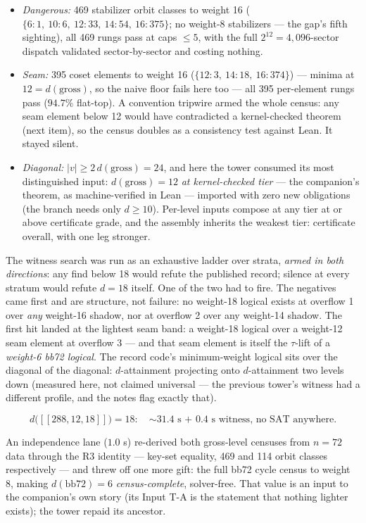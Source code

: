 \documentclass[11pt]{article}
\theoremstyle{plain}
\theoremstyle{definition}
\theoremstyle{remark}
\newcommand{\wt}[1]{\lvert #1\rvert}
\begin{document}
\begin{itemize}[leftmargin=2em]
\item \emph{Dangerous:} 469 stabilizer orbit classes to weight 16
  ($\{6{:}1,\ 10{:}6,\ 12{:}33,\ 14{:}54,\ 16{:}375\}$; no weight-8
  stabilizers --- the gap's fifth sighting), all 469 rungs pass at caps
  $\leq 5$, with the full $2^{12} = 4{,}096$-sector dispatch validated
  sector-by-sector and costing nothing.
\item \emph{Seam:} 395 coset elements to weight 16 ($\{12{:}3,\
  14{:}18,\ 16{:}374\}$) --- minima at $12 = d(\mathrm{gross})$, so the
  naive floor fails here too --- all 395 per-element rungs pass ($94.7\%$
  flat-top). A convention tripwire armed the whole census: any seam
  element below 12 would have contradicted a kernel-checked theorem
  (next item), so the census doubles as a consistency test against Lean.
  It stayed silent.
\item \emph{Diagonal:} $\wt v \geq 2\, d(\mathrm{gross}) = 24$, and
  here the tower consumed its most distinguished input: $d(\mathrm{gross})
  = 12$ \emph{at kernel-checked tier} --- the companion's theorem, as
  machine-verified in Lean --- imported with zero new obligations (the
  branch needs only $d \geq 10$). Per-level inputs compose at any tier
  at or above certificate grade, and the assembly inherits the weakest
  tier: certificate overall, with one leg stronger.
\end{itemize}

The witness search was run as an exhaustive ladder over strata,
\emph{armed in both directions}: any find below 18 would refute the
published record; silence at every stratum would refute $d = 18$ itself.
One of the two had to fire. The negatives came first and are structure,
not failure: no weight-18 logical exists at overflow 1 over \emph{any}
weight-16 shadow, nor at overflow 2 over any weight-14 shadow. The first
hit landed at the lightest seam band: a weight-18 logical over a
weight-12 seam element at overflow 3 --- and that seam element is itself
the $\tau$-lift of a \emph{weight-6 bb72 logical}. The record code's
minimum-weight logical sits over the diagonal of the diagonal:
$d$-attainment projecting onto $d$-attainment two levels down (measured
here, not claimed universal --- the previous tower's witness had a
different profile, and the notes flag exactly that).

\[
d\bigl([[288,12,18]]\bigr) = 18:
\quad \text{${\sim}31.4$ s + $0.4$ s witness, no SAT anywhere.}
\]

An independence lane ($1.0$ s) re-derived both gross-level censuses from
$n = 72$ data through the R3 identity --- key-set equality, 469 and 114
orbit classes respectively --- and threw off one more gift: the full
bb72 cycle census to weight 8, making $d(\mathrm{bb72}) = 6$
\emph{census-complete}, solver-free. That value is an input to the
companion's own story (its Input T-A is the statement that nothing
lighter exists); the tower repaid its ancestor.
\end{document}
